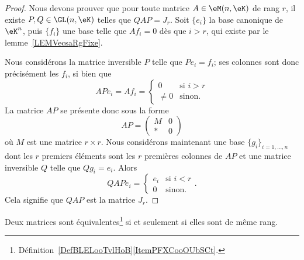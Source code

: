 \begin{proof}
	Nous devons prouver que pour toute matrice \( A\in\eM(n,\eK)\) de rang \( r\), il existe \( P,Q\in\GL(n,\eK)\) telles que \(QAP=J_r\). Soit \( \{ e_i \}\) la base canonique de \( \eK^n\), puis \( \{ f_i \}\) une base telle que \( Af_i=0\) dès que \( i>r\), qui existe par le lemme~\ref{LEMVecsaRgFixe}.

	Nous considérons la matrice inversible \( P\) telle que \( Pe_i=f_i\); ses colonnes sont donc précisément les \( f_i \), si bien que
	\begin{equation}
		APe_i=Af_i=\begin{cases}
			0      & \text{si } i>r \\
			\neq 0 & \text{sinon}.
		\end{cases}
	\end{equation}
	La matrice \( AP\) se présente donc sous la forme
	\begin{equation}
		AP=\begin{pmatrix}
			M & 0 \\
			* & 0
		\end{pmatrix}
	\end{equation}
	où \( M\) est une matrice \( r\times r\). Nous considérons maintenant une base \( \{ g_i \}_{i=1,\ldots, n}\) dont les \( r\) premiers éléments sont les \( r\) premières colonnes de \( AP\) et une matrice inversible \( Q\) telle que \( Qg_i=e_i\). Alors
	\begin{equation}
		QAPe_i=\begin{cases}
			e_i & \text{si } i<r \\
			0   & \text{sinon}.
		\end{cases}.
	\end{equation}
	Cela signifie que \( QAP\) est la matrice \( J_r\).
\end{proof}

\begin{corollary}      \label{CorGOUYooErfOIe}
	Deux matrices sont équivalentes\footnote{Définition~\ref{DefBLELooTvlHoB}\ref{ItemPFXCooOUbSCt}.} si et seulement si elles sont de même rang.
\end{corollary}

